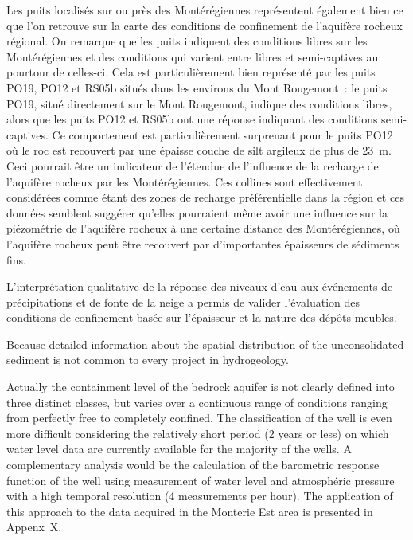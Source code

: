 \documentclass[WHATMANUAL.tex]{subfiles}
\begin{document}
Les puits localisés sur ou près des Montérégiennes représentent également bien ce que l'on retrouve sur la carte des conditions de confinement de l’aquifère rocheux régional. On remarque que les puits indiquent des conditions libres sur les Montérégiennes et des conditions qui varient entre libres et semi-captives au pourtour de celles-ci. Cela est particulièrement bien représenté par les puits PO19, PO12 et RS05b situés dans les environs du Mont Rougemont : le puits PO19, situé directement sur le Mont Rougemont, indique des conditions libres, alors que les puits PO12 et RS05b ont une réponse indiquant des conditions semi-captives. Ce comportement est particulièrement surprenant pour le puits PO12 où le roc est recouvert par une épaisse couche de silt argileux de plus de 23 m. Ceci pourrait être un indicateur de l'étendue de l'influence de la recharge de l’aquifère rocheux par les Montérégiennes. Ces collines sont effectivement considérées comme étant des zones de recharge préférentielle dans la région et ces données semblent suggérer qu’elles pourraient même avoir une influence sur la piézométrie de l’aquifère rocheux à une certaine distance des Montérégiennes, où l’aquifère rocheux peut être recouvert par d'importantes épaisseurs de sédiments fins.

L'interprétation qualitative de la réponse des niveaux d'eau aux événements de précipitations et de fonte de la neige a permis de valider l’évaluation des conditions de confinement basée sur l’épaisseur et la nature des dépôts meubles. 

Because detailed information about the spatial distribution of the unconsolidated sediment is not common to every project in hydrogeology.

Actually the containment level of the bedrock aquifer is not clearly defined into three distinct classes, but varies over a continuous range of conditions ranging from perfectly free to completely confined. The classification of the well is even more difficult considering the relatively short period (2 years or less) on which water level data are currently available for the majority of the wells. A complementary analysis would be the calculation of the barometric response function of the well using measurement of water level and atmosphéric pressure with a high temporal resolution (4 measurements per hour). The application of this approach to the data acquired in the Monterie Est area is presented in Appenx~X.
\end{document}
